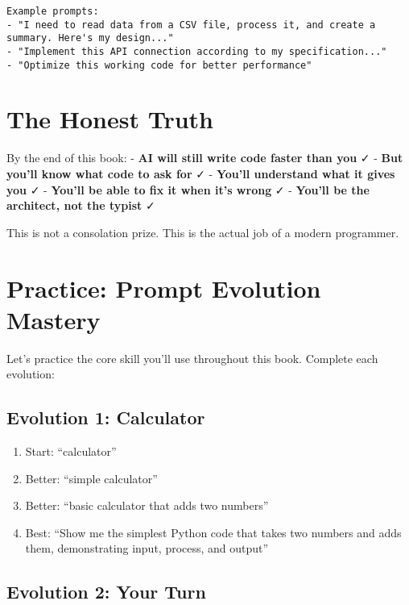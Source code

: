 \documentclass[
  letterpaper,
  DIV=11,
  numbers=noendperiod,
  oneside]{scrreprt}
\providecommand{\tightlist}{%
  \setlength{\itemsep}{0pt}\setlength{\parskip}{0pt}}\usepackage{longtable,booktabs,array}
\begin{document}
\begin{verbatim}
Example prompts:
- "I need to read data from a CSV file, process it, and create a summary. Here's my design..."
- "Implement this API connection according to my specification..."
- "Optimize this working code for better performance"
\end{verbatim}

\section{The Honest Truth}\label{the-honest-truth}

By the end of this book: - \textbf{AI will still write code faster than
you} ✓ - \textbf{But you'll know what code to ask for} ✓ -
\textbf{You'll understand what it gives you} ✓ - \textbf{You'll be able
to fix it when it's wrong} ✓ - \textbf{You'll be the architect, not the
typist} ✓

This is not a consolation prize. This is the actual job of a modern
programmer.

\section{Practice: Prompt Evolution
Mastery}\label{practice-prompt-evolution-mastery}

Let's practice the core skill you'll use throughout this book. Complete
each evolution:

\subsection{Evolution 1: Calculator}\label{evolution-1-calculator}

\begin{enumerate}
\def\labelenumi{\arabic{enumi}.}
\tightlist
\item
  Start: ``calculator''
\item
  Better: ``simple calculator''
\item
  Better: ``basic calculator that adds two numbers''
\item
  Best: ``Show me the simplest Python code that takes two numbers and
  adds them, demonstrating input, process, and output''
\end{enumerate}

\subsection{Evolution 2: Your Turn}\label{evolution-2-your-turn}
\end{document}
